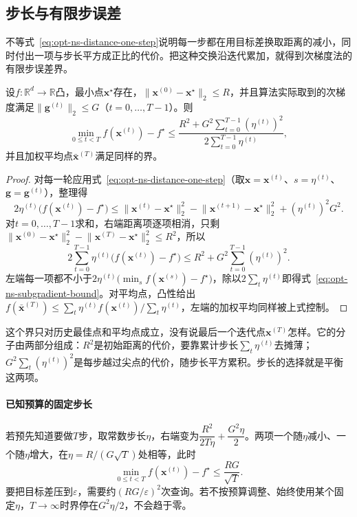 \subsection{步长与有限步误差}
\label{sec:opt-ns-subgradient-rate}

不等式~\eqref{eq:opt-ns-distance-one-step}说明每一步都在用目标差换取距离的减小，同时付出一项与步长平方成正比的代价。把这种交换沿迭代累加，就得到次梯度法的有限步误差界。

\begin{theorem}[次梯度法的有限步误差]
\label{thm:opt-ns-subgradient-rate}
设$f:\mathbb R^d\to\mathbb R$凸，最小点$\bm x^\star$存在，$\lVert\bm x^{(0)}-\bm x^\star\rVert_2\leq R$，并且算法实际取到的次梯度满足$\lVert\bm g^{(t)}\rVert_2\leq G$（$t=0,\dots,T-1$）。则
\begin{equation}
 \min_{0\leq t<T}f(\bm x^{(t)})-f^\star\leq\frac{R^2+G^2\sum_{t=0}^{T-1}(\eta^{(t)})^2}{2\sum_{t=0}^{T-1}\eta^{(t)}},
 \label{eq:opt-ns-subgradient-bound}
\end{equation}
并且加权平均点$\bar{\bm x}^{(T)}$满足同样的界。
\end{theorem}

\begin{proof}
对每一轮应用式~\eqref{eq:opt-ns-distance-one-step}（取$\bm x=\bm x^{(t)}$、$s=\eta^{(t)}$、$\bm g=\bm g^{(t)}$），整理得
\[
 2\eta^{(t)}\bigl(f(\bm x^{(t)})-f^\star\bigr)\leq\lVert\bm x^{(t)}-\bm x^\star\rVert_2^2-\lVert\bm x^{(t+1)}-\bm x^\star\rVert_2^2+(\eta^{(t)})^2G^2.
\]
对$t=0,\dots,T-1$求和，右端距离项逐项相消，只剩$\lVert\bm x^{(0)}-\bm x^\star\rVert_2^2-\lVert\bm x^{(T)}-\bm x^\star\rVert_2^2\leq R^2$，所以
\[
 2\sum_{t=0}^{T-1}\eta^{(t)}\bigl(f(\bm x^{(t)})-f^\star\bigr)\leq R^2+G^2\sum_{t=0}^{T-1}(\eta^{(t)})^2.
\]
左端每一项都不小于$2\eta^{(t)}\bigl(\min_sf(\bm x^{(s)})-f^\star\bigr)$，除以$2\sum_t\eta^{(t)}$即得式~\eqref{eq:opt-ns-subgradient-bound}。对平均点，凸性给出$f(\bar{\bm x}^{(T)})\leq\sum_t\eta^{(t)}f(\bm x^{(t)})/\sum_t\eta^{(t)}$，左端的加权平均同样被上式控制。
\end{proof}

这个界只对历史最佳点和平均点成立，没有说最后一个迭代点$\bm x^{(T)}$怎样。它的分子由两部分组成：$R^2$是初始距离的代价，要靠累计步长$\sum_t\eta^{(t)}$去摊薄；$G^2\sum_t(\eta^{(t)})^2$是每步越过尖点的代价，随步长平方累积。步长的选择就是平衡这两项。

\paragraph{已知预算的固定步长}
若预先知道要做$T$步，取常数步长$\eta$，右端变为$\dfrac{R^2}{2T\eta}+\dfrac{G^2\eta}{2}$。两项一个随$\eta$减小、一个随$\eta$增大，在$\eta=R/(G\sqrt T)$处相等，此时
\[
 \min_{0\leq t<T}f(\bm x^{(t)})-f^\star\leq\frac{RG}{\sqrt T}.
\]
要把目标差压到$\varepsilon$，需要约$(RG/\varepsilon)^2$次查询。若不按预算调整、始终使用某个固定$\eta$，$T\to\infty$时界停在$G^2\eta/2$，不会趋于零。

